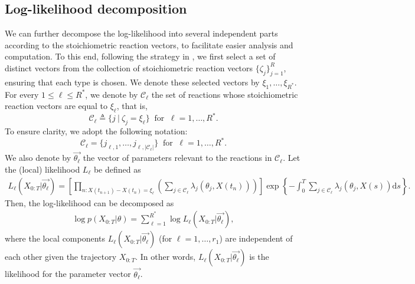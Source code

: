 \documentclass[pdflatex,sn-mathphys-num]{sn-jnl}%
\def\dd{\text{d}}
\theoremstyle{thmstyleone}%
\theoremstyle{thmstyletwo}%
\theoremstyle{thmstylethree}%
\begin{document}
\subsection{Log-likelihood decomposition}

We can further decompose the log-likelihood into several independent parts according to the stoichiometric reaction vectors, to facilitate easier analysis and computation.
To this end, following the strategy in \cite[Supplementary Information, Section S3]{fang2024advanced}, we first select a set of distinct vectors from the collection of stoichiometric reaction vectors $\{ \zeta_j \}^{R}_{j=1}$,
ensuring that each type is chosen.
We denote these selected vectors by 
$\xi_1, \dots, \xi_{R^*}$.
For every $1 \leq \ell \leq R^*$, we denote by $\mathcal C_\ell$ the set of reactions whose stoichiometric reaction vectors are equal to $\xi_\ell$, that is,
\[
\mathcal C_\ell \triangleq \{j \ | \ \zeta_j=\xi_\ell \}
\ \text{ for } \ 
\ell=1,\dots,R^*.
\]
To ensure clarity, we adopt the following notation:
\[
\mathcal C_\ell = \{ j_{\ell, 1}, \dots, j_{\ell, \left| \mathcal C_\ell \right|} \}
\ \text{ for } \ 
\ell=1,\dots,R^*.
\]
We also denote by $\overrightarrow{\theta_\ell}$ the vector of parameters relevant to the reactions in $\mathcal C_\ell$. 
Let the (local) likelihood $L_\ell$ be defined as
\begin{equation}
\begin{aligned}
L_\ell\left(X_{0:T}\big|\overrightarrow{\theta_\ell}\right) = \left[\prod_{n: X(t_{n+1})-X(t_n) = \xi_\ell}
    \left( \sum_{j\in\mathcal C_\ell} \lambda_j\left(\theta_j, X(t_n)\right) \right)\right]
    \exp\left\{
        - \int_0^T \sum_{j\in\mathcal C_\ell} \lambda_j(\theta_j, X(s)) \dd s
    \right\}.
\end{aligned}
\label{eq:local_likelihood_with_times}
\end{equation}
Then, the log-likelihood can be decomposed as 
\begin{align*}
    \log p\left(X_{0:T}\big| \theta\right)
    = 
    \sum_{\ell =1}^{R^*} \log L_\ell\left(X_{0:T}\big|\overrightarrow{\theta_\ell}\right),
\end{align*}
where the local components $L_\ell\left(X_{0:T}\big|\overrightarrow{\theta_\ell}\right)$ (for $\ell =1,\dots, r_1$) are independent of each other given the trajectory $X_{0:T}$.
In other words, $L_\ell\left(X_{0:T}\big|\overrightarrow{\theta_\ell}\right)$ is the likelihood for the parameter vector $\overrightarrow{\theta_\ell}$.
\end{document}
